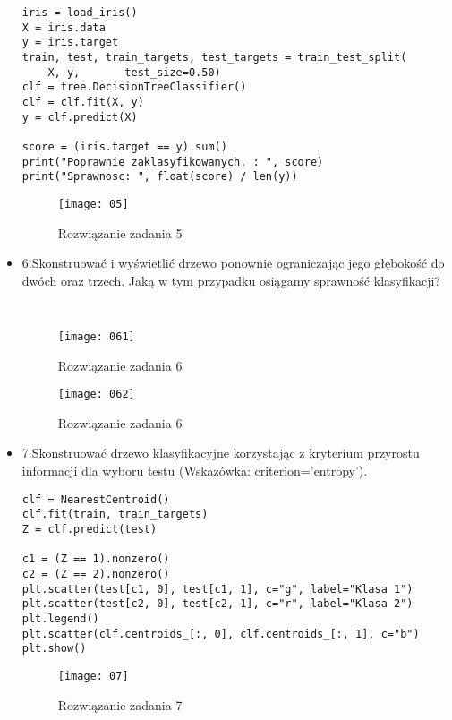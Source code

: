 \documentclass[12pt,a4paper]{article}
\begin{document}
\begin{itemize}
\begin{lstlisting}
iris = load_iris()
X = iris.data
y = iris.target
train, test, train_targets, test_targets = train_test_split(
    X, y,       test_size=0.50)
clf = tree.DecisionTreeClassifier()
clf = clf.fit(X, y)
y = clf.predict(X)

score = (iris.target == y).sum()
print("Poprawnie zaklasyfikowanych. : ", score)
print("Sprawnosc: ", float(score) / len(y))

	\end{lstlisting}
		\begin{figure}[h]
                        \texttt{[image: 05]}
                        \centering
			\caption{Rozwiązanie zadania 5}
			\label{fig:fig5}
                \end{figure}
                \clearpage

        \item 6.Skonstruować i wyświetlić drzewo ponownie ograniczając jego głębokość do dwóch oraz trzech. Jaką w tym przypadku osiągamy sprawność klasyfikacji?
        \begin{lstlisting}
                
	\end{lstlisting}
		\begin{figure}[h]
                        \texttt{[image: 061]}
                        \centering
			\caption{Rozwiązanie zadania 6}
			\label{fig:fig6}
                \end{figure}
                \begin{figure}[h]
                        \texttt{[image: 062]}
                        \centering
			\caption{Rozwiązanie zadania 6}
			\label{fig:fig6.1}
                \end{figure}
                \clearpage

                        \item 7.Skonstruować drzewo klasyfikacyjne korzystając z kryterium przyrostu informacji dla wyboru testu (Wskazówka: criterion=’entropy’).
	\begin{lstlisting}
clf = NearestCentroid()
clf.fit(train, train_targets)
Z = clf.predict(test)

c1 = (Z == 1).nonzero()
c2 = (Z == 2).nonzero()
plt.scatter(test[c1, 0], test[c1, 1], c="g", label="Klasa 1")
plt.scatter(test[c2, 0], test[c2, 1], c="r", label="Klasa 2")
plt.legend()
plt.scatter(clf.centroids_[:, 0], clf.centroids_[:, 1], c="b")
plt.show()
	\end{lstlisting}
		\begin{figure}[h]
                        \texttt{[image: 07]}
                        \centering
			\caption{Rozwiązanie zadania 7}
			\label{fig:fig7}
                \end{figure}
                \clearpage


\end{itemize}
\end{document}
